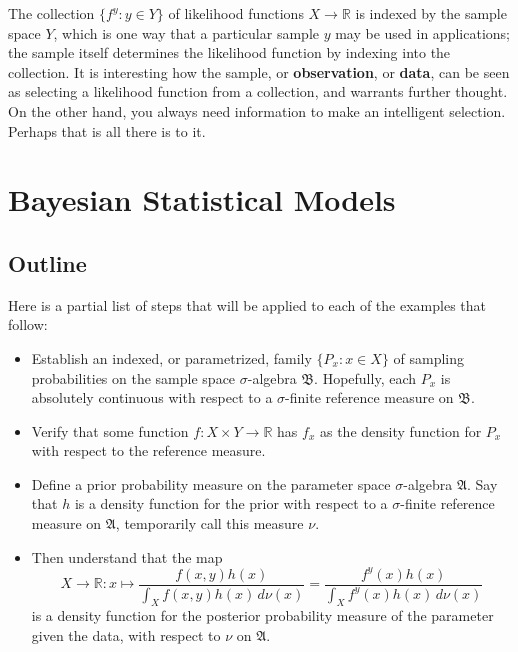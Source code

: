 \documentclass[
twoside=true,
paper=letter,
fontsize=9pt,
pagesize=auto,
leqno,
openany,
headsepline,
overfullrule,
]{scrbook}
\theoremstyle{plain}
\theoremstyle{plain}
\theoremstyle{definition}
\theoremstyle{bfnoteitalic}
\theoremstyle{bfnoteroman}
\newcommand{\term}[1]{\textbf{#1}\index{#1}}
\newcommand{\sigalg}[1]{\mathfrak{#1}}
\newcommand{\textsigma}{\hbox{\large{$\sigma$}}\kern-1pt}
\newcommand{\R}{\mathbb{R}}
\newcommand{\funcf}{f}
\newcommand{\funch}{h}
\newcommand{\function}{f}
\newcommand{\functioniii}{h}
\newcommand{\measurespace}{X}
\newcommand{\measurespaceii}{Y}
\newcommand{\measureii}{\nu}
\newcommand{\measnu}{\nu}
\newcommand{\pspace}{\measurespace}%
\newcommand{\sspace}{\measurespaceii}%
\newcommand{\pspaceelt}{x}
\newcommand{\sspaceelt}{y}
\newcommand{\sspacesig}{\sigalg{B}}
\newcommand{\pspacesig}{\sigalg{A}}
\begin{document}
The collection
$\{\function^\sspaceelt:\sspaceelt\in\sspace \}$
of likelihood functions $\pspace\to\R$ is indexed by the sample space
$\sspace$, which is one way that a particular sample $\sspaceelt$ may be used in applications; the sample itself determines the likelihood function by indexing into the collection. It is interesting how the sample, or \term{observation}, or \term{data}, can be seen as selecting a likelihood function from a collection, and warrants further thought. On the other hand, you always need information to make an intelligent selection. Perhaps that is all there is to it.




\chapter{Bayesian Statistical Models}\label{bayesian_statistical_models_examples}


\section{Outline}
Here is a partial list of steps that will be applied to each of the examples that follow:
\begin{itemize}
\item
Establish an indexed, or parametrized, family
$\{ P_\pspaceelt :\pspaceelt\in\pspace \}$
of sampling probabilities on the sample space \textsigma-algebra 
$\sspacesig$. Hopefully, each
$P_\pspaceelt$
is absolutely continuous with respect to a \textsigma-finite reference measure on $\sspacesig$.
\item
Verify that some function
$\function : \pspace\times\sspace\to\R$
has $\funcf_\pspaceelt$ as  the density function for
$P_\pspaceelt$ with respect to the reference measure.
\item
Define a prior probability measure on the parameter space \textsigma-algebra
$\pspacesig$.
Say that $\funch$ is a density function for the prior with respect to a \textsigma-finite reference measure on $\pspacesig$, temporarily call this measure $\measnu$.
\item
Then understand that the map
\[
\pspace\to\R:
\pspaceelt
\mapsto
\frac{\function(\pspaceelt,\sspaceelt)\functioniii(\pspaceelt)}
{\displaystyle
\int_{\pspace} \function(\pspaceelt,\sspaceelt)\functioniii(\pspaceelt)
\,d\measureii(\pspaceelt)}
=
\frac{\function^\sspaceelt(\pspaceelt)\functioniii(\pspaceelt)}
{\displaystyle
\int_{\pspace} \function^\sspaceelt(\pspaceelt)\functioniii(\pspaceelt)
\,d\measureii(\pspaceelt)}
\]
is a density function for the posterior probability measure of the parameter given the data,
with respect to $\measnu$ on $\pspacesig$.
\end{itemize}
\end{document}
